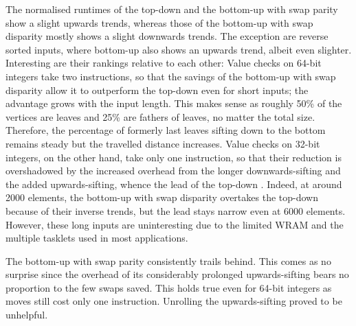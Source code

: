 The normalised runtimes of the top-down \HS{} and the bottom-up \HS{} with swap parity show a slight upwards trends, whereas those of the bottom-up \HS{} with swap disparity mostly shows a slight downwards trends.
The exception are reverse sorted inputs, where bottom-up \HS{} also shows an upwards trend, albeit even slighter.
Interesting are their rankings relative to each other:
Value checks on 64-bit integers take two instructions, so that the savings of the bottom-up \HS{} with swap disparity allow it to outperform the top-down \HS{} even for short inputs;
the advantage grows with the input length.
This makes sense as roughly 50\% of the vertices are leaves and 25\% are fathers of leaves, no matter the total size.
Therefore, the percentage of formerly last leaves sifting down to the bottom remains steady but the travelled distance increases.
Value checks on 32-bit integers, on the other hand, take only one instruction, so that their reduction is overshadowed by the increased overhead from the longer downwards-sifting and the added upwards-sifting, whence the lead of the top-down \HS{}.
Indeed, at around 2000 elements, the bottom-up \HS{} with swap disparity overtakes the top-down \HS{} because of their inverse trends, but the lead stays narrow even at 6000 elements.
However, these long inputs are uninteresting due to the limited WRAM and the multiple tasklets used in most applications.

The bottom-up \HS{} with swap parity consistently trails behind.
This comes as no surprise since the overhead of its considerably prolonged upwards-sifting bears no proportion to the few swaps saved.
This holds true even for 64-bit integers as moves still cost only one instruction.
Unrolling the upwards-sifting proved to be unhelpful.
